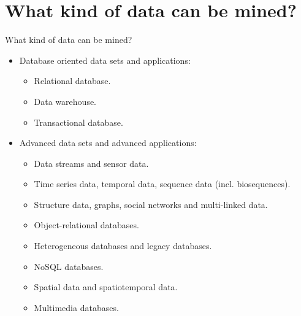 \section{What kind of data can be mined?}

\begin{frame}{What kind of data can be mined?}
	\begin{itemize}
		\item Database oriented data sets and applications:
		\begin{itemize}
			\item Relational database.
			\item Data warehouse.
			\item Transactional database.
		\end{itemize}
		\item Advanced data sets and advanced applications:
		\begin{itemize}
			\item Data streams and sensor data.
			\item Time series data, temporal data, sequence data (incl. 
			biosequences).
			\item Structure data, graphs, social networks and multi-linked data.
			\item Object-relational databases.
			\item Heterogeneous databases and legacy databases.
			\item NoSQL databases.
			\item Spatial data and spatiotemporal data.
			\item Multimedia databases.
		\end{itemize}
	\end{itemize}
\end{frame}